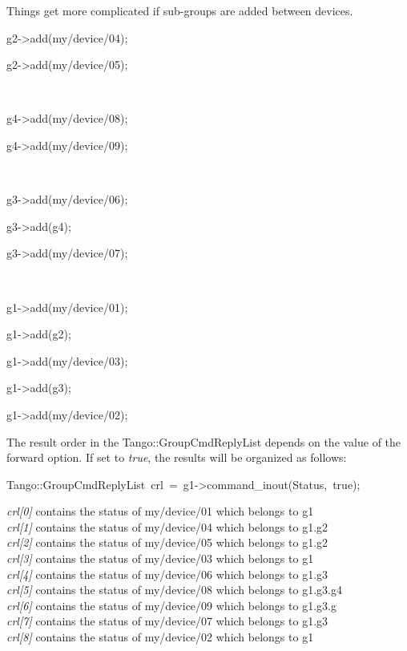 Things get more complicated if sub-groups are added \textquotedbl{}between\textquotedbl{}
devices.
\begin{lyxcode}
g2->add(\textquotedbl{}my/device/04\textquotedbl{});

g2->add(\textquotedbl{}my/device/05\textquotedbl{});

~

g4->add(\textquotedbl{}my/device/08\textquotedbl{});

g4->add(\textquotedbl{}my/device/09\textquotedbl{});

~

g3->add(\textquotedbl{}my/device/06\textquotedbl{});

g3->add(g4);

g3->add(\textquotedbl{}my/device/07\textquotedbl{});

~

g1->add(\textquotedbl{}my/device/01\textquotedbl{});

g1->add(g2);

g1->add(\textquotedbl{}my/device/03\textquotedbl{});

g1->add(g3);

g1->add(\textquotedbl{}my/device/02\textquotedbl{});
\end{lyxcode}
The result order in the Tango::GroupCmdReplyList depends on the value
of the forward option. If set to \emph{true}, the
results will be organized as follows:
\begin{lyxcode}
Tango::GroupCmdReplyList~crl~=~g1->command\_inout(\textquotedbl{}Status\textquotedbl{},~true);
\end{lyxcode}
\emph{crl{[}0{]}} contains the status of my/device/01 which belongs
to g1\\
\emph{crl{[}1{]}} contains the status of my/device/04 which belongs
to g1.g2\\
\emph{crl{[}2{]}} contains the status of my/device/05 which belongs
to g1.g2\\
\emph{crl{[}3{]}} contains the status of my/device/03 which belongs
to g1\\
\emph{crl{[}4{]}} contains the status of my/device/06 which belongs
to g1.g3\\
\emph{crl{[}5{]}} contains the status of my/device/08 which belongs
to g1.g3.g4\\
\emph{crl{[}6{]}} contains the status of my/device/09 which belongs
to g1.g3.g \\
\emph{crl{[}7{]}} contains the status of my/device/07 which belongs
to g1.g3\\
\emph{crl{[}8{]}} contains the status of my/device/02 which belongs
to g1 

